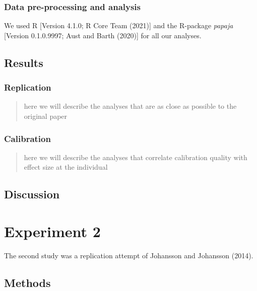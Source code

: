 \documentclass[
  english,
  man]{apa6}
\begin{document}
\hypertarget{data-pre-processing-and-analysis}{%
\subsubsection{Data pre-processing and analysis}\label{data-pre-processing-and-analysis}}

We used R {[}Version 4.1.0; R Core Team (2021){]} and the R-package \emph{papaja} {[}Version 0.1.0.9997; Aust and Barth (2020){]} for all our analyses.

\hypertarget{results}{%
\subsection{Results}\label{results}}

\hypertarget{replication}{%
\subsubsection{Replication}\label{replication}}

\begin{quote}
here we will describe the analyses that are as close as possible to the original paper
\end{quote}

\hypertarget{calibration}{%
\subsubsection{Calibration}\label{calibration}}

\begin{quote}
here we will describe the analyses that correlate calibration quality with effect size at the individual
\end{quote}

\hypertarget{discussion}{%
\subsection{Discussion}\label{discussion}}

\hypertarget{experiment-2}{%
\section{Experiment 2}\label{experiment-2}}

The second study was a replication attempt of Johansson and Johansson (2014).

\hypertarget{methods-1}{%
\subsection{Methods}\label{methods-1}}
\end{document}
